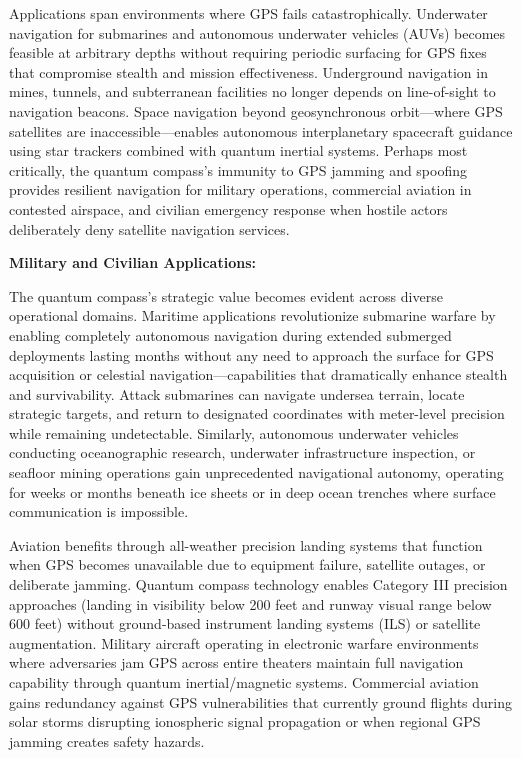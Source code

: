 \documentclass[11pt,a4paper,twoside]{article}
\begin{document}
Applications span environments where GPS fails catastrophically. Underwater navigation for submarines and autonomous underwater vehicles (AUVs) becomes feasible at arbitrary depths without requiring periodic surfacing for GPS fixes that compromise stealth and mission effectiveness. Underground navigation in mines, tunnels, and subterranean facilities no longer depends on line-of-sight to navigation beacons. Space navigation beyond geosynchronous orbit---where GPS satellites are inaccessible---enables autonomous interplanetary spacecraft guidance using star trackers combined with quantum inertial systems. Perhaps most critically, the quantum compass's immunity to GPS jamming and spoofing provides resilient navigation for military operations, commercial aviation in contested airspace, and civilian emergency response when hostile actors deliberately deny satellite navigation services.

\textbf{Military and Civilian Applications:}

The quantum compass's strategic value becomes evident across diverse operational domains. Maritime applications revolutionize submarine warfare by enabling completely autonomous navigation during extended submerged deployments lasting months without any need to approach the surface for GPS acquisition or celestial navigation---capabilities that dramatically enhance stealth and survivability. Attack submarines can navigate undersea terrain, locate strategic targets, and return to designated coordinates with meter-level precision while remaining undetectable. Similarly, autonomous underwater vehicles conducting oceanographic research, underwater infrastructure inspection, or seafloor mining operations gain unprecedented navigational autonomy, operating for weeks or months beneath ice sheets or in deep ocean trenches where surface communication is impossible.

Aviation benefits through all-weather precision landing systems that function when GPS becomes unavailable due to equipment failure, satellite outages, or deliberate jamming. Quantum compass technology enables Category III precision approaches (landing in visibility below 200 feet and runway visual range below 600 feet) without ground-based instrument landing systems (ILS) or satellite augmentation. Military aircraft operating in electronic warfare environments where adversaries jam GPS across entire theaters maintain full navigation capability through quantum inertial/magnetic systems. Commercial aviation gains redundancy against GPS vulnerabilities that currently ground flights during solar storms disrupting ionospheric signal propagation or when regional GPS jamming creates safety hazards.
\end{document}
